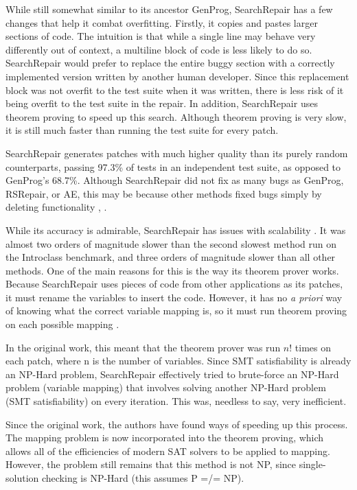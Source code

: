 \documentclass[conference]{IEEEtran}
\begin{document}
While still somewhat similar to its ancestor GenProg, SearchRepair has a few changes that help it combat overfitting. 
Firstly, it copies and pastes larger sections of code. 
The intuition is that while a single line may behave very differently out of context, a multiline block of code is less likely to do so. 
SearchRepair would prefer to replace the entire buggy section with a correctly implemented version written by another human developer. 
Since this replacement block was not overfit to the test suite when it was written, there is less risk of it being overfit to the test suite in the repair. 
In addition, SearchRepair uses theorem proving to speed up this search. 
Although theorem proving is very slow, it is still much faster than running the test suite for every patch. 


SearchRepair generates patches with much higher quality than its purely random counterparts, passing 97.3\% of tests in an independent test suite, as opposed to GenProg's 68.7\%. 
Although SearchRepair did not fix as many bugs as GenProg, RSRepair, or AE, this may be because other methods fixed bugs simply by deleting functionality \cite{SearchRepair}, \cite{plausibility}. 


While its accuracy is admirable, SearchRepair has issues with scalability \cite{srthesis}. 
It was almost two orders of magnitude slower than the second slowest method run on the Introclass benchmark, and three orders of magnitude slower than all other methods. 
One of the main reasons for this is the way its theorem prover works. 
Because SearchRepair uses pieces of code from other applications as its patches, it must rename the variables to insert the code. 
However, it has no \textit{a priori} way of knowing what the correct variable mapping is, so it must run theorem proving on each possible mapping \cite{srthesis}. 

In the original work, this meant that the theorem prover was run $n!$ times on each patch, where n is the number of variables. 
Since SMT satisfiability is already an NP-Hard problem, SearchRepair effectively tried to brute-force an NP-Hard problem (variable mapping) that involves solving another NP-Hard problem (SMT satisfiability) on every iteration. 
This was, needless to say, very inefficient. 

Since the original work, the authors have found ways of speeding up this process. The mapping problem is now incorporated into the theorem proving, which allows all of the efficiencies of modern SAT solvers to be applied to mapping. However, the problem still remains that this method is not NP, since single-solution checking is NP-Hard (this assumes P =/= NP). 
\end{document}
